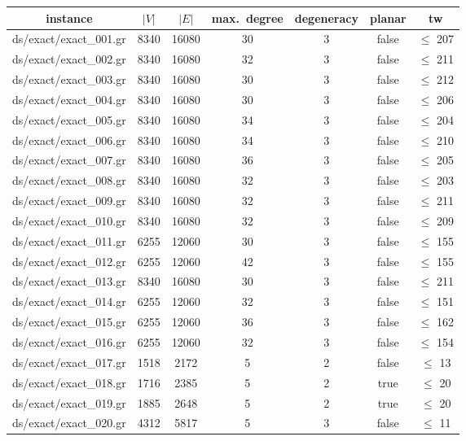 \documentclass{standalone}
\begin{document}
\begin{tabular}{|c|c|c|c|c|c|c|}
\hline 
instance              & $|V|$ & $|E|$   & max.\ degree & degeneracy & planar & tw \\
\hline 
ds/exact/exact\_001.gr & 8340  &  16080  &  30   &  3   &  false & $\leq $ 207 \\ 
ds/exact/exact\_002.gr & 8340  &  16080  &  32   &  3   &  false & $\leq $ 211 \\
ds/exact/exact\_003.gr & 8340  &  16080  &  30   &  3   &  false & $\leq $ 212 \\
ds/exact/exact\_004.gr & 8340  &  16080  &  30   &  3   &  false & $\leq $ 206 \\
ds/exact/exact\_005.gr & 8340  &  16080  &  34   &  3   &  false & $\leq $ 204 \\
ds/exact/exact\_006.gr & 8340  &  16080  &  34   &  3   &  false & $\leq $ 210 \\
ds/exact/exact\_007.gr & 8340  &  16080  &  36   &  3   &  false & $\leq $ 205 \\
ds/exact/exact\_008.gr & 8340  &  16080  &  32   &  3   &  false & $\leq $ 203 \\
ds/exact/exact\_009.gr & 8340  &  16080  &  32   &  3   &  false & $\leq $ 211 \\
ds/exact/exact\_010.gr & 8340  &  16080  &  32   &  3   &  false & $\leq $ 209 \\
ds/exact/exact\_011.gr & 6255  &  12060  &  30   &  3   &  false & $\leq $ 155 \\
ds/exact/exact\_012.gr & 6255  &  12060  &  42   &  3   &  false & $\leq $ 155 \\
ds/exact/exact\_013.gr & 8340  &  16080  &  30   &  3   &  false & $\leq $ 211 \\
ds/exact/exact\_014.gr & 6255  &  12060  &  32   &  3   &  false & $\leq $ 151 \\
ds/exact/exact\_015.gr & 6255  &  12060  &  36   &  3   &  false & $\leq $ 162 \\
ds/exact/exact\_016.gr & 6255  &  12060  &  32   &  3   &  false & $\leq $ 154 \\
ds/exact/exact\_017.gr & 1518  &  2172   &  5    &  2   &  false & $\leq $ 13  \\
ds/exact/exact\_018.gr & 1716  &  2385   &  5    &  2   &  true  & $\leq $ 20  \\
ds/exact/exact\_019.gr & 1885  &  2648   &  5    &  2   &  true  & $\leq $ 20  \\
ds/exact/exact\_020.gr & 4312  &  5817   &  5    &  3   &  false & $\leq $ 11  \\

\end{tabular}
\end{document}
